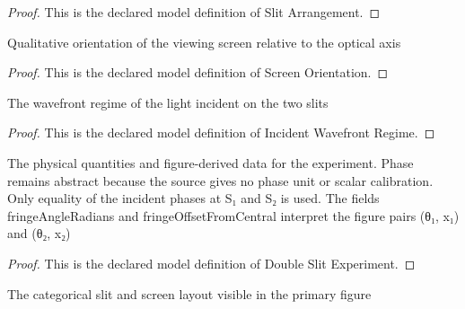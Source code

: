 \begin{proof}
  This is the declared model definition of Slit Arrangement.
\end{proof}
\begin{definition}
  \label{def:physics:phyx-mini-0125:phyxminiproblems-problemphyxmini0125-screenorientation}
  Qualitative orientation of the viewing screen relative to the optical axis
\end{definition}
\begin{proof}
  This is the declared model definition of Screen Orientation.
\end{proof}
\begin{definition}
  \label{def:physics:phyx-mini-0125:phyxminiproblems-problemphyxmini0125-incidentwavefrontregime}
  The wavefront regime of the light incident on the two slits
\end{definition}
\begin{proof}
  This is the declared model definition of Incident Wavefront Regime.
\end{proof}
\begin{definition}
  \label{def:physics:phyx-mini-0125:phyxminiproblems-problemphyxmini0125-doubleslitexperiment}
  The physical quantities and figure-derived data for the experiment. Phase remains abstract because the source gives no phase unit or scalar calibration. Only equality of the incident phases at S₁ and S₂ is used. The fields fringeAngleRadians and fringeOffsetFromCentral interpret the figure pairs (θ₁, x₁) and (θ₂, x₂)
\end{definition}
\begin{proof}
  This is the declared model definition of Double Slit Experiment.
\end{proof}
\begin{definition}
  \label{def:physics:phyx-mini-0125:phyxminiproblems-problemphyxmini0125-hasdepictedlayout}
  The categorical slit and screen layout visible in the primary figure
\end{definition}
